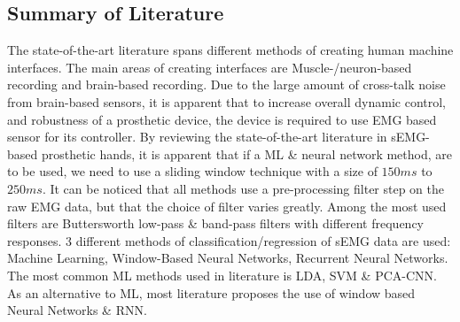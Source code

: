\documentclass[../main.tex]{subfiles}
\begin{document}


\subsection{Summary of Literature}

The state-of-the-art literature spans different methods of creating human machine interfaces.
The main areas of creating interfaces are Muscle-/neuron-based recording and brain-based recording.
Due to the large amount of cross-talk noise from brain-based sensors, it is apparent that to increase overall dynamic control, and robustness of a prosthetic device, the device is required to use EMG based sensor for its controller.
By reviewing the state-of-the-art literature in sEMG-based prosthetic hands, it is apparent that if a \gls{ML} \& neural network method, are to be used, we need to use a sliding window technique with a size of $150ms$ to $250ms$.
It can be noticed that all methods use a pre-processing filter step on the raw EMG data, but that the choice of filter varies greatly.
Among the most used filters are Buttersworth low-pass \& band-pass filters with different frequency responses.
3 different methods of classification/regression of sEMG data are used: Machine Learning, Window-Based Neural Networks, Recurrent Neural Networks.
The most common \gls{ML} methods used in literature is \gls{LDA}, \gls{SVM} \& \gls{PCA-CNN}.
As an alternative to ML, most literature proposes the use of window based Neural Networks \& \gls{RNN}.
\end{document}
